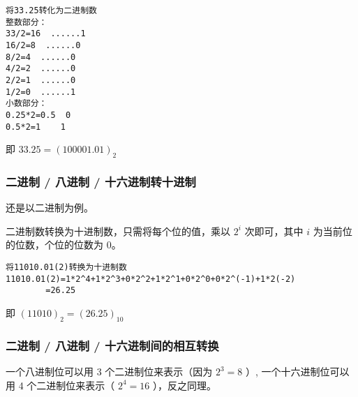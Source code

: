 \begin{verbatim}
将33.25转化为二进制数
整数部分：
33/2=16  ......1
16/2=8  ......0
8/2=4  ......0
4/2=2  ......0
2/2=1  ......0
1/2=0  ......1
小数部分：
0.25*2=0.5  0
0.5*2=1    1
\end{verbatim}

即 $33.25 = (100001.01)_2$

\subsubsection{二进制 / 八进制 / 十六进制转十进制}

还是以二进制为例。

二进制数转换为十进制数，只需将每个位的值，乘以 $2^i$ 次即可，其中 $i$ 为当前位的位数，个位的位数为 0。

\begin{verbatim}
将11010.01(2)转换为十进制数
11010.01(2)=1*2^4+1*2^3+0*2^2+1*2^1+0*2^0+0*2^(-1)+1*2(-2)
        =26.25
\end{verbatim}

即 $(11010)_2 = (26.25)_{10}$

\subsubsection{二进制 / 八进制 / 十六进制间的相互转换}

一个八进制位可以用 3 个二进制位来表示（因为 $2^3 =8$ ）, 一个十六进制位可以用 4 个二进制位来表示（ $2^4 = 16$ ），反之同理。
